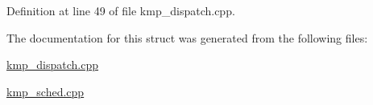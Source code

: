 Definition at line 49 of file kmp\-\_\-dispatch.\-cpp.



The documentation for this struct was generated from the following files\-:\begin{DoxyCompactItemize}
\item 
\hyperlink{kmp__dispatch_8cpp}{kmp\-\_\-dispatch.\-cpp}\item 
\hyperlink{kmp__sched_8cpp}{kmp\-\_\-sched.\-cpp}\end{DoxyCompactItemize}
